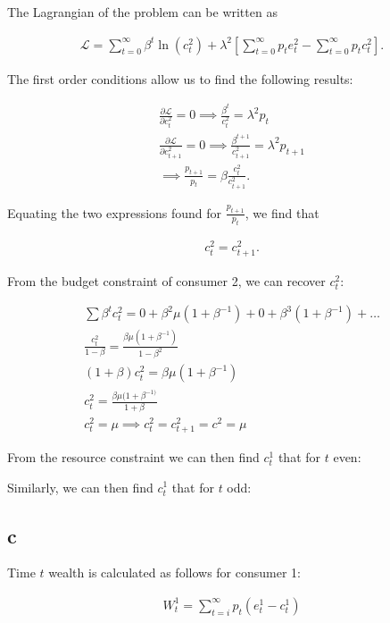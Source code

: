 \documentclass{article}
\begin{document}
The Lagrangian of the problem can be written as

\begin{gather*}
    \mathcal{L} = \sum^\infty_{t=0} \beta^t\ln(c^2_t) + \lambda^2 \left[ \sum^\infty_{t=0} p_te_t^2 - \sum^\infty_{t=0} p_tc^2_t \right].
\end{gather*}

The first order conditions allow us to find the following results:

\begin{gather*}
    \frac{\partial \mathcal{L}}{\partial c_t^2} = 0 \implies \frac{\beta^t}{c^2_t} = \lambda^2p_t \\
    \frac{\partial \mathcal{L}}{\partial c_{t+1}^2} = 0 \implies \frac{\beta^{t+1}}{c^2_{t+1}} = \lambda^2p_{t+1} \\
    \implies \frac{p_{t+1}}{p_{t}} = \beta \frac{c^2_{t}}{c^2_{t+1}}.
\end{gather*}

Equating the two expressions found for $\frac{p_{t+1}}{p_t}$, we find that

\begin{gather*}
c^2_t = c^2_{t+1}.
\end{gather*}

From the budget constraint of consumer 2, we can recover $c^2_t$:

\begin{gather*}
    \sum \beta^tc^2_t = 0 + \beta^2\mu(1+\beta^{-1}) + 0 + \beta^3(1+\beta^{-1})+ \hdots \\
    \frac{c_t^2}{1-\beta} = \frac{\beta\mu(1+\beta^{-1})}{1-\beta^2}\\
    (1+\beta)c^2_t = \beta\mu(1+\beta^{-1})\\
    c^2_t = \frac{\beta\mu(1+\beta^{-1)}}{1+\beta}\\
    c^2_t = \mu
    \implies c^2_t = c^2_{t+1} = c^2 = \mu
\end{gather*}

From the resource constraint we can then find $c^1_t$ that for $t$ even:


Similarly, we can then find $c^1_t$ that for $t$ odd:


\subsection{c}

Time $t$ wealth is calculated as follows for consumer 1:

\begin{gather*}
    W_t^1 = \sum^\infty_{t = i} p_t(e^1_t-c^1_t)
\end{gather*}
\end{document}
